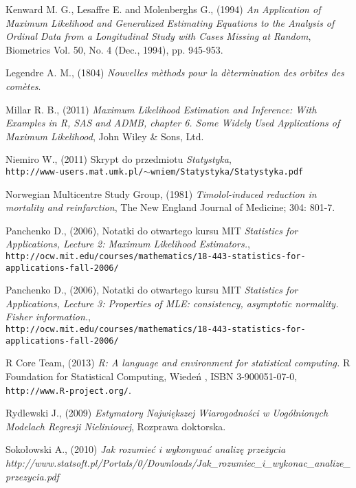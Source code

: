 \begin{thebibliography}{99}
 Kenward M. G., Lesaffre E. and Molenberghs G., (1994) \textit{An Application of Maximum Likelihood and Generalized Estimating Equations to the Analysis of Ordinal Data from a Longitudinal Study with Cases Missing at Random}, Biometrics
Vol. 50, No. 4 (Dec., 1994), pp. 945-953.

 Legendre A. M., (1804) \textit{Nouvelles m\`ethods pour la d\`etermination des orbites des com\`etes}.

 Millar R. B., (2011) \textit{Maximum Likelihood Estimation and Inference: With Examples in R, SAS and ADMB, chapter 6. Some Widely Used Applications of Maximum Likelihood}, John Wiley \& Sons, Ltd.

 Niemiro W., (2011) Skrypt do przedmiotu \textit{Statystyka}, \\ \texttt{http://www-users.mat.umk.pl/$\sim$wniem/Statystyka/Statystyka.pdf}

 Norwegian Multicentre Study Group, (1981) \textit{Timolol-induced reduction in
mortality and reinfarction}, The New England  Journal of Medicine; 304: 801-7.


 Panchenko D., (2006), Notatki do otwartego kursu MIT \textit{Statistics for Applications, Lecture 2: Maximum Likelihood Estimators.}, \\
\texttt{http://ocw.mit.edu/courses/mathematics/18-443-statistics-for-applications-fall-2006/}



 Panchenko D., (2006), Notatki do otwartego kursu MIT \textit{Statistics for Applications, Lecture 3: Properties of MLE: consistency, asymptotic normality. Fisher information.}, \\
\texttt{http://ocw.mit.edu/courses/mathematics/18-443-statistics-for-applications-fall-2006/}



 R Core Team, (2013) \textit{R: A language and environment for statistical computing.} R Foundation for Statistical Computing, Wiedeń , ISBN 3-900051-07-0, \texttt{http://www.R-project.org/}.

 Rydlewski J., (2009) \textit{Estymatory Największej Wiarogodności w Uogólnionych Modelach Regresji Nieliniowej}, Rozprawa doktorska.

 Sokołowski A., (2010) \textit{Jak rozumieć i wykonywać analizę przeżycia} \textit{http://www.statsoft.pl/Portals/0/Downloads/Jak\_rozumiec\_i\_wykonac\_analize\_przezycia.pdf}


\end{thebibliography}

